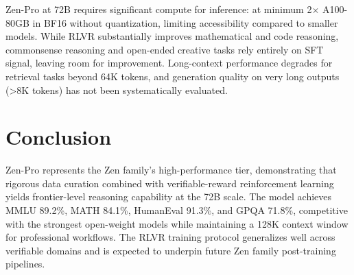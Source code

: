 \documentclass[11pt,a4paper]{article}
\begin{document}
Zen-Pro at 72B requires significant compute for inference: at minimum 2$\times$ A100-80GB in
BF16 without quantization, limiting accessibility compared to smaller models. While RLVR
substantially improves mathematical and code reasoning, commonsense reasoning and open-ended
creative tasks rely entirely on SFT signal, leaving room for improvement. Long-context
performance degrades for retrieval tasks beyond 64K tokens, and generation quality on very
long outputs (>8K tokens) has not been systematically evaluated.

\section{Conclusion}

Zen-Pro represents the Zen family's high-performance tier, demonstrating that rigorous data
curation combined with verifiable-reward reinforcement learning yields frontier-level reasoning
capability at the 72B scale. The model achieves MMLU 89.2\%, MATH 84.1\%, HumanEval 91.3\%,
and GPQA 71.8\%, competitive with the strongest open-weight models while maintaining a 128K
context window for professional workflows. The RLVR training protocol generalizes well across
verifiable domains and is expected to underpin future Zen family post-training pipelines.
\end{document}
